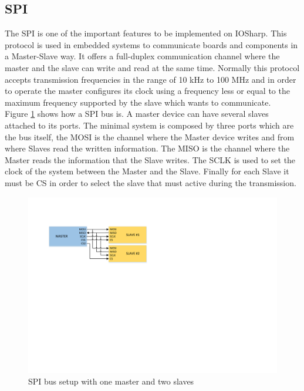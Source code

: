 \subsection{SPI}\label{SS:IOSharp-SPI}
The \gls{SPI} is one of the important features to be implemented on IOSharp. This protocol is used in embedded systems to communicate boards and components in a Master-Slave way. It offers a full-duplex communication channel where the master and the slave can write and read at the same time. Normally this protocol accepts transmission frequencies in the range of 10 kHz to 100 MHz and in order to operate the master configures its clock using a frequency less or equal to the maximum frequency supported by the slave which wants to communicate.
\\
Figure \ref{fig:spi-modules} shows how a SPI bus is. A master device can have several slaves attached to its ports. The minimal system is composed by three ports which are the bus itself, the \gls{MOSI} is the channel where the Master device writes and from where Slaves read the written information. The \gls{MISO} is the channel where the Master reads the information that the Slave writes. The \gls{SCLK} is used to set the clock of the system between the Master and the Slave. Finally for each Slave it must be \gls{CS} in order to select the slave that must active during the transmission.
\begin{figure}[H]\begin{center}
 \centering
  \captionsetup{justification=centering}
  \includegraphics[scale=0.9]{pictures/iosharp/spi-modules}
  \caption{SPI bus setup with one master and two slaves \label{fig:spi-modules}}
\end{center}\end{figure}

